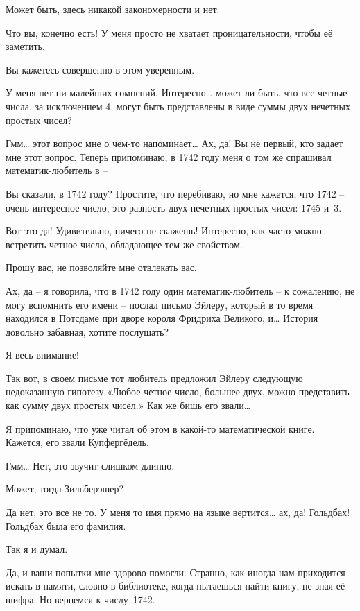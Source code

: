 \documentclass[../main.tex]{subfiles}
\begin{document}
\begin{dialogue}
 Может быть, здесь никакой закономерности и нет.

 Что вы, конечно есть! У меня просто не хватает проницательности, чтобы её заметить.

 Вы кажетесь совершенно в этом уверенным.

 У меня нет ни малейших сомнений. Интересно\ldots{} может ли быть, что все четные числа, за исключением 4, могут быть представлены в виде суммы двух нечетных простых чисел?

 Гмм\ldots{} этот вопрос мне о чем-то напоминает\ldots{} Ах, да! Вы не первый, кто задает мне этот вопрос. Теперь припоминаю, в 1742 году меня о том же спрашивал математик-любитель в \---

 Вы сказали, в 1742 году? Простите, что перебиваю, но мне кажется, что 1742 \--- очень интересное число, это разность двух нечетных простых чисел: 1745 и~3.

 Вот это да! Удивительно, ничего не скажешь! Интересно, как часто можно встретить четное число, обладающее тем же свойством.

 Прошу вас, не позволяйте мне отвлекать вас.

 Ах, да \--- я говорила, что в 1742 году один математик-любитель \--- к сожалению, не могу вспомнить его имени \--- послал письмо Эйлеру, который в то время находился в Потсдаме при дворе короля Фридриха Великого, и\ldots{} История довольно забавная, хотите послушать?

 Я весь внимание!

 Так вот, в своем письме тот любитель предложил Эйлеру следующую недоказанную гипотезу «Любое четное число, большее двух, можно представить как сумму двух простых чисел.» Как же бишь его звали\ldots{}

 Я припоминаю, что уже читал об этом в какой-то математической книге. Кажется, его звали Купфергёдель.

 Гмм\ldots{} Нет, это звучит слишком длинно.

 Может, тогда Зильберэшер?

 Да нет, это все не то. У меня то имя прямо на языке вертится\ldots{} ах, да! Гольдбах! Гольдбах была его фамилия.

 Так я и думал.

 Да, и ваши попытки мне здорово помогли. Странно, как иногда нам приходится искать в памяти, словно в библиотеке, когда пытаешься найти книгу, не зная её шифра. Но вернемся к числу~1742.


\end{dialogue}
\end{document}
